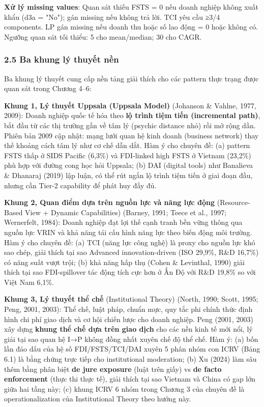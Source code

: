 \documentclass[12pt,a4paper]{article}
\begin{document}
\textbf{Xử lý missing values}: Quan sát thiếu FSTS = 0 nếu doanh nghiệp
không xuất khẩu (d3a = "No"); gán missing nếu không trả lời. TCI yêu cầu
≥3/4 components. LP gán missing nếu doanh thu hoặc số lao động = 0 hoặc
không có. Ngưỡng quan sát tối thiểu: 5 cho mean/median; 30 cho CAGR.

\hypertarget{25-ba-khung-luxfd-thuyux1ebft-nux1ec1n}{%
\subsubsection{2.5 Ba khung lý thuyết
nền}\label{25-ba-khung-luxfd-thuyux1ebft-nux1ec1n}}

Ba khung lý thuyết cung cấp nền tảng giải thích cho các pattern thực
trạng được quan sát trong Chương 4--6:

\textbf{Khung 1, Lý thuyết Uppsala (Uppsala Model)} (Johanson \& Vahlne,
1977, 2009): Doanh nghiệp quốc tế hóa theo \textbf{lộ trình tiệm tiến
(incremental path)}, bắt đầu từ các thị trường gần về tâm lý (psychic
distance nhỏ) rồi mở rộng dần. Phiên bản 2009 cập nhật: mạng lưới quan
hệ kinh doanh (business network) thay thế khoảng cách tâm lý như cơ chế
dẫn dắt. Hàm ý cho chuyên đề: (a) pattern FSTS thấp ở SIDS Pacific
(6,3\%) và FDI-linked high FSTS ở Vietnam (23,2\%) phù hợp với đường
cong học hỏi Uppsala; (b) DAI (digital tools) như Banalieva \& Dhanaraj
(2019) lập luận, có thể rút ngắn lộ trình tiệm tiến ở giai đoạn đầu,
nhưng cần Tier-2 capability để phát huy đầy đủ.

\textbf{Khung 2, Quan điểm dựa trên nguồn lực và năng lực động}
(Resource-Based View + Dynamic Capabilities) (Barney, 1991; Teece et
al., 1997; Wernerfelt, 1984): Doanh nghiệp đạt lợi thế cạnh tranh bền
vững thông qua nguồn lực VRIN và khả năng tái cấu hình năng lực theo
biến động môi trường. Hàm ý cho chuyên đề: (a) TCI (năng lực công nghệ)
là proxy cho nguồn lực khó sao chép, giải thích tại sao Advanced
innovation-driven (ISO 29,9\%, R\&D 16,7\%) có năng suất vượt trội; (b)
khả năng hấp thụ (Cohen \& Levinthal, 1990) giải thích tại sao
FDI-spillover tác động tích cực hơn ở Ấn Độ với R\&D 19,8\% so với Việt
Nam 6,1\%.

\textbf{Khung 3, Lý thuyết thể chế} (Institutional Theory) (North, 1990;
Scott, 1995; Peng, 2001, 2003): Thể chế, luật pháp, chuẩn mực, quy tắc
phi chính thức định hình chi phí giao dịch và cơ hội chiến lược cho
doanh nghiệp. Peng (2001, 2003) xây dựng \textbf{khung thể chế dựa trên
giao dịch} cho các nền kinh tế mới nổi, lý giải tại sao quan hệ I→P
không đồng nhất xuyên chế độ thể chế. Hàm ý: (a) bốn lần đảo dấu của hệ
số FDI/FSTS/TCI/DAI xuyên 5 phân nhóm con ICRV (Bảng 6.1) là bằng chứng
trực tiếp cho institutional moderation; (b) Xu (2024) làm sâu thêm bằng
phân biệt \textbf{de jure exposure} (luật trên giấy) vs \textbf{de facto
enforcement} (thực thi thực tế), giải thích tại sao Vietnam và China có
gap lớn giữa hai tầng này; (c) khung ICRV 6 nhóm trong Chương 3 của
chuyên đề là operationalization của Institutional Theory theo hướng này.
\end{document}
